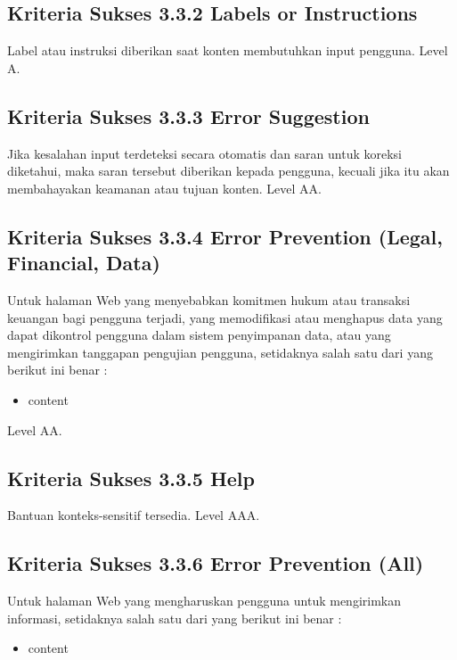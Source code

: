 \subsection{Kriteria Sukses 3.3.2 Labels or Instructions}
\label{sec:kriteria_3.3.2}
Label atau instruksi diberikan saat konten membutuhkan input pengguna.
Level A.

\subsection{Kriteria Sukses 3.3.3 Error Suggestion}
\label{sec:kriteria_3.3.3}
Jika kesalahan input terdeteksi secara otomatis dan saran untuk koreksi diketahui, maka saran tersebut diberikan kepada pengguna, kecuali jika itu akan membahayakan keamanan atau tujuan konten.
Level AA.

\subsection{Kriteria Sukses 3.3.4 Error Prevention (Legal, Financial, Data)}
\label{sec:kriteria_3.3.4}
Untuk halaman Web yang menyebabkan komitmen hukum atau transaksi keuangan bagi pengguna terjadi, yang memodifikasi atau menghapus data yang dapat dikontrol pengguna dalam sistem penyimpanan data, atau yang mengirimkan tanggapan pengujian pengguna, setidaknya salah satu dari yang berikut ini benar :

\begin{itemize}
	\item content
\end{itemize}

Level AA.

\subsection{Kriteria Sukses 3.3.5 Help}
\label{sec:kriteria_3.3.5}
Bantuan konteks-sensitif tersedia.
Level AAA.

\subsection{Kriteria Sukses 3.3.6 Error Prevention (All)}
\label{sec:kriteria_3.3.6}
Untuk halaman Web yang mengharuskan pengguna untuk mengirimkan informasi, setidaknya salah satu dari yang berikut ini benar :

\begin{itemize}
	\item content
\end{itemize}

